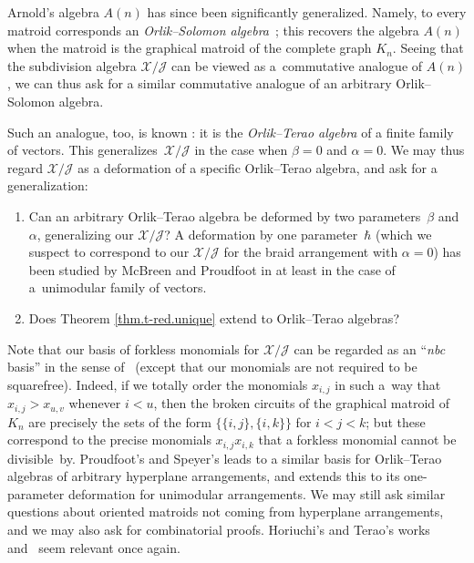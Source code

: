 \documentclass[pdftex]{sigma}
\numberwithin{equation}{section}
\begin{document}
Arnold's algebra $A(n) $ has since been significantly generalized. Namely, to every matroid corresponds an \textit{Orlik--Solomon algebra}~\cite{CorEti01}; this recovers the algebra $A(n) $ when the matroid is the graphical matroid of the complete graph $K_{n}$. Seeing that the subdivision algebra $\mathcal{X}/\mathcal{J}$ can be viewed as a~commutative analogue of $A(n) $, we can thus ask for a similar commutative analogue of an arbitrary Orlik--Solomon algebra.

Such an analogue, too, is known \cite{SchToh15}: it is the \textit{Orlik--Terao algebra} of a finite family of vectors. This generalizes~$\mathcal{X}/\mathcal{J}$ in the case when $\beta=0$ and $\alpha=0$. We may thus regard $\mathcal{X}/\mathcal{J}$ as a deformation of a specific Orlik--Terao algebra, and ask for a generalization:

\begin{question}\quad
\begin{enumerate}\itemsep=0pt
\item[(a)] Can an arbitrary Orlik--Terao algebra be deformed by two parameters~$\beta$ and~$\alpha$, generalizing our $\mathcal{X}/\mathcal{J}$? A deformation by one parameter~$\hbar$ (which we suspect to correspond to our $\mathcal{X}/\mathcal{J}$ for the braid arrangement with $\alpha=0$) has been studied by McBreen and Proudfoot in \cite[Appendix~A.2]{McbPro15} at least in the case of a~unimodular family of vectors.
\item[(b)] Does Theorem \ref{thm.t-red.unique} extend to Orlik--Terao algebras?
\end{enumerate}
\end{question}

 Note that our basis of forkless monomials for $\mathcal{X}/\mathcal{J}$ can be regarded as an ``\textit{nbc} basis'' in the sense of~\cite{CorEti01} (except that our monomials are not required to be squarefree). Indeed, if we totally order the monomials $x_{i,j}$ in such a~way that $x_{i,j}>x_{u,v}$ whenever $i<u$, then the broken circuits of the graphical matroid of $K_{n}$ are precisely the sets of the form $\{\{i,j\} ,\{i,k\}\} $ for $i<j<k$; but these correspond to the precise monomials $x_{i,j}x_{i,k}$ that a forkless monomial cannot be divisible~by. Proudfoot's and Speyer's \cite[Theorem~4]{ProSpe06} leads to a similar basis for Orlik--Terao algebras of arbitrary hyperplane arrangements, and \cite[Theorem~A.9]{McbPro15} extends this to its one-parameter deformation for unimodular arrangements. We may still ask similar questions about oriented matroids not coming from hyperplane arrangements, and we may also ask for combinatorial proofs. Horiuchi's and Terao's works~\cite{HorTer03} and~\cite{Terao02} seem relevant once again.
\end{document}
